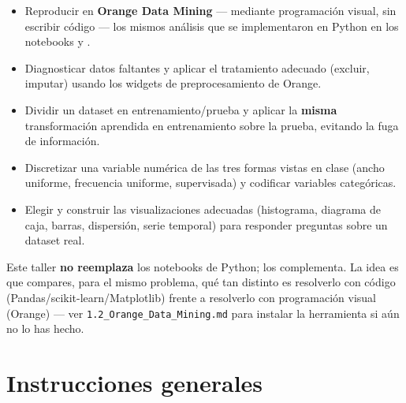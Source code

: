 \documentclass[11pt,letterpaper]{article}
\begin{document}
\begin{itemize}[leftmargin=1.2cm]
  \item Reproducir en \textbf{Orange Data Mining} --- mediante programación visual, sin escribir código --- los mismos análisis que se implementaron en Python en los notebooks \texttt{} y \texttt{}.
  \item Diagnosticar datos faltantes y aplicar el tratamiento adecuado (excluir, imputar) usando los widgets de preprocesamiento de Orange.
  \item Dividir un dataset en entrenamiento/prueba y aplicar la \textbf{misma} transformación aprendida en entrenamiento sobre la prueba, evitando la fuga de información.
  \item Discretizar una variable numérica de las tres formas vistas en clase (ancho uniforme, frecuencia uniforme, supervisada) y codificar variables categóricas.
  \item Elegir y construir las visualizaciones adecuadas (histograma, diagrama de caja, barras, dispersión, serie temporal) para responder preguntas sobre un dataset real.
\end{itemize}

\begin{nota}
Este taller \textbf{no reemplaza} los notebooks de Python; los complementa. La idea es que compares, para el mismo problema, qué tan distinto es resolverlo con código (Pandas/scikit-learn/Matplotlib) frente a resolverlo con programación visual (Orange) --- ver \texttt{1.2\_Orange\_Data\_Mining.md} para instalar la herramienta si aún no lo has hecho.
\end{nota}

\section{Instrucciones generales}
\end{document}
